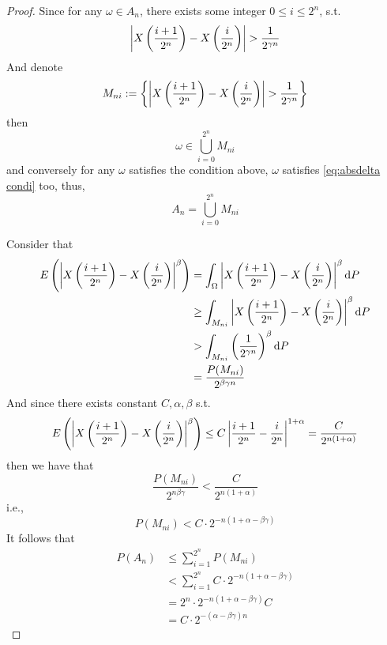 \documentclass{homework}
\begin{document}
    \begin{subproblem}
        \item
        \begin{proof}
            Since for any $\omega\in A_n$, there exists some
            integer
            $0\leq i\leq 2^n$, s.t.
            \begin{equation}
                \label{eq:absdelta condi}
                \absdelta>\frac{1}{2^{\gamma n}}
            \end{equation}
            And denote
            \[M_{ni}:=\left\{\absdelta>\frac{1}{2^{\gamma n}}\right\}\]
            then
            \[\omega\in\bigcup_{i=0}^{2^n}M_{ni}\]
            and conversely for any $\omega$ satisfies the condition above,
            $\omega$ satisfies \cref{eq:absdelta condi} too, thus,
            \[A_n=\bigcup_{i=0}^{2^n}M_{ni}\]

            Consider that
            \[\begin{aligned}
                E\left(\left|X\left(\frac{i+1}{2^n}\right)-X\left(\frac{i}{2^n}\right)\right|^\beta\right)&=\int_\Omega\left|X\left(\frac{i+1}{2^n}\right)-X\left(\frac{i}{2^n}\right)\right|^\beta\mathrm d P\\
                &\geq\int_{M_{ni}}\left|X\left(\frac{i+1}{2^n}\right)-X\left(\frac{i}{2^n}\right)\right|^\beta\mathrm d P\\
                &>\int_{M_{ni}}\left(\frac{1}{2^{\gamma n}}\right)^\beta\mathrm d P\\
                &=\frac{P(M_{ni})}{2^{\beta\gamma n}}
            \end{aligned}\]
            And since there exists constant $C,\alpha,\beta$ s.t.
            \[E\left(\left|X\left(\frac{i+1}{2^n}\right)-X\left(\frac{i}{2^n}\right)\right|^\beta\right)
            \leq C\left|\frac{i+1}{2^n}-\frac{i}{2^n}\right|^{1+\alpha}
            =\frac{C}{2^{n(1+\alpha)}}\]
            then we have that
            \[\frac{P(M_{ni})}{2^{n\beta\gamma}}
            <\frac{C}{2^{n(1+\alpha)}}\]
            i.e.,
            \[P(M_{ni})<C\cdot 2^{-n(1+\alpha-\beta\gamma)}\]
            It follows that
            \[\begin{aligned}
                P(A_n)&\leq\sum_{i=1}^{2^n}P(M_{ni})\\
                &<\sum_{i=1}^{2^n}C\cdot 2^{-n(1+\alpha-\beta\gamma)}\\
                &=2^n\cdot 2^{-n(1+\alpha-\beta\gamma)}C\\
                &=C\cdot 2^{-(\alpha-\beta\gamma)n}
            \end{aligned}\]
        \end{proof}


\end{subproblem}
\end{document}
